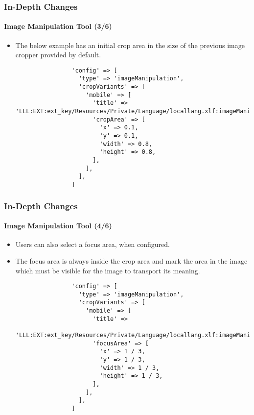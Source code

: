 \begin{frame}[fragile]
	\frametitle{In-Depth Changes}
	\framesubtitle{Image Manipulation Tool (3/6)}

	\lstset{basicstyle=\tiny\ttfamily}

	\begin{itemize}

		\item The below example has an initial crop area in the size
			of the previous image cropper provided by default.

			\begin{lstlisting}
				'config' => [
				  'type' => 'imageManipulation',
				  'cropVariants' => [
				    'mobile' => [
				      'title' => 'LLL:EXT:ext_key/Resources/Private/Language/locallang.xlf:imageManipulation.mobile',
				      'cropArea' => [
				        'x' => 0.1,
				        'y' => 0.1,
				        'width' => 0.8,
				        'height' => 0.8,
				      ],
				    ],
				  ],
				]
			\end{lstlisting}

	\end{itemize}

\end{frame}


\begin{frame}[fragile]
	\frametitle{In-Depth Changes}
	\framesubtitle{Image Manipulation Tool (4/6)}

	\lstset{basicstyle=\tiny\ttfamily}

	\begin{itemize}
		\item Users can also select a focus area, when configured.
		\item The focus area is always inside the crop area and mark the area in the image
			which must be visible for the image to transport its meaning.

			\begin{lstlisting}
				'config' => [
				  'type' => 'imageManipulation',
				  'cropVariants' => [
				    'mobile' => [
				      'title' =>
				        'LLL:EXT:ext_key/Resources/Private/Language/locallang.xlf:imageManipulation.mobile',
				      'focusArea' => [
				        'x' => 1 / 3,
				        'y' => 1 / 3,
				        'width' => 1 / 3,
				        'height' => 1 / 3,
				      ],
				    ],
				  ],
				]
			\end{lstlisting}

	\end{itemize}

\end{frame}

